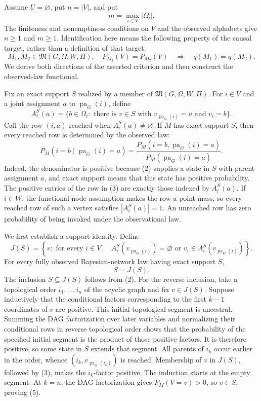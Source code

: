 Assume \(U=\varnothing\), put \(n=|V|\), and put
\[
 m=\max_{i\in V}|\Omega_i|.
\]
The finiteness and nonemptiness conditions on \(V\) and the observed alphabets give \(n\geq 1\) and \(m\geq 1\).  Identification here means the following property of the causal target, rather than a definition of that target:
\[
 M_1,M_2\in\mathfrak M(G,\Omega,W,\Pi),\quad
 P_{M_1}(V)=P_{M_2}(V)
 \quad\Longrightarrow\quad q(M_1)=q(M_2).
 \tag{1}
\]
We derive both directions of the asserted criterion and then construct the observed-law functional.

Fix an exact support \(S\) realized by a member of \(\mathfrak M(G,\Omega,W,\Pi)\).  For \(i\in V\) and a joint assignment \(a\) to \(\operatorname{pa}_G(i)\), define
\[
 A_i^S(a)=\bigl\{b\in\Omega_i:\text{ there is }v\in S
 \text{ with }v_{\operatorname{pa}_G(i)}=a\text{ and }v_i=b\bigr\}.
 \tag{2}
\]
Call the row \((i,a)\) reached when \(A_i^S(a)\neq\varnothing\).  If \(M\) has exact support \(S\), then every reached row is determined by the observed law:
\[
 P_M(i=b\mid \operatorname{pa}_G(i)=a)
 =\frac{P_M(i=b,\operatorname{pa}_G(i)=a)}
 {P_M(\operatorname{pa}_G(i)=a)}.
 \tag{3}
\]
Indeed, the denominator is positive because (2) supplies a state in \(S\) with parent assignment \(a\), and exact support means that this state has positive probability.  The positive entries of the row in (3) are exactly those indexed by \(A_i^S(a)\).  If \(i\in W\), the functional-node assumption makes the row a point mass, so every reached row of such a vertex satisfies \(|A_i^S(a)|=1\).  An unreached row has zero probability of being invoked under the observational law.

We first establish a support identity.  Define
\[
 J(S)=\left\{v:\text{ for every }i\in V,\quad
 A_i^S(v_{\operatorname{pa}_G(i)})=\varnothing
 \text{ or }v_i\in A_i^S(v_{\operatorname{pa}_G(i)})\right\}.
 \tag{4}
\]
For every fully observed Bayesian-network law having exact support \(S\),
\[
 S=J(S).
 \tag{5}
\]
The inclusion \(S\subseteq J(S)\) follows from (2).  For the reverse inclusion, take a topological order \(i_1,\ldots,i_n\) of the acyclic graph and fix \(v\in J(S)\).  Suppose inductively that the conditional factors corresponding to the first \(k-1\) coordinates of \(v\) are positive.  This initial topological segment is ancestral.  Summing the DAG factorization over later variables and normalizing their conditional rows in reverse topological order shows that the probability of the specified initial segment is the product of those positive factors.  It is therefore positive, so some state in \(S\) extends that segment.  All parents of \(i_k\) occur earlier in the order, whence \((i_k,v_{\operatorname{pa}_G(i_k)})\) is reached.  Membership of \(v\) in \(J(S)\), followed by (3), makes the \(i_k\)-factor positive.  The induction starts at the empty segment.  At \(k=n\), the DAG factorization gives \(P_M(V=v)>0\), so \(v\in S\), proving (5).

